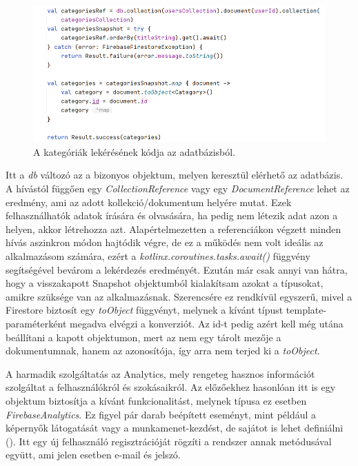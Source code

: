 \begin{figure}[!ht]
	\centering
	\includegraphics[width=150mm, keepaspectratio]{figures/firestore_query.png}
	\caption{A kategóriák lekérésének kódja az adatbázisból.}
	\label{fig:FirestoreQuery}
\end{figure}

Itt a \emph{db} változó az a bizonyos objektum, melyen keresztül elérhető az adatbázis. A hívástól függően egy \emph{CollectionReference} vagy egy \emph{DocumentReference} lehet az eredmény, ami az adott kollekció/dokumentum helyére mutat. Ezek felhasználhatók adatok írására és olvasására, ha pedig nem létezik adat azon a helyen, akkor létrehozza azt. Alapértelmezetten a referenciákon végzett minden hívás aszinkron módon hajtódik végre, de ez a működés nem volt ideális az alkalmazásom számára, ezért a \emph{kotlinx.coroutines.tasks.await()} függvény segítségével bevárom a lekérdezés eredményét. Ezután már csak annyi van hátra, hogy a visszakapott Snapshot objektumból kialakítsam azokat a típusokat, amikre szüksége van az alkalmazásnak. Szerencsére ez rendkívül egyszerű, mivel a Firestore biztosít egy \emph{toObject} függvényt, melynek a kívánt típust template-paraméterként megadva elvégzi a konverziót. Az id-t pedig azért kell még utána beállítani a kapott objektumon, mert az nem egy tárolt mezője a dokumentumnak, hanem az azonosítója, így arra nem terjed ki a \emph{toObject}.

A harmadik szolgáltatás az Analytics, mely rengeteg hasznos információt szolgáltat a felhasználókról és szokásaikról. Az előzőekhez hasonlóan itt is egy objektum biztosítja a kívánt funkcionalitást, melynek típusa ez esetben \emph{FirebaseAnalytics}. Ez figyel pár darab beépített eseményt, mint például a képernyők látogatását vagy a munkamenet-kezdést, de sajátot is lehet definiálni (). Itt egy új felhasználó regisztrációját rögzíti a rendszer annak metódusával együtt, ami jelen esetben e-mail és jelszó.

